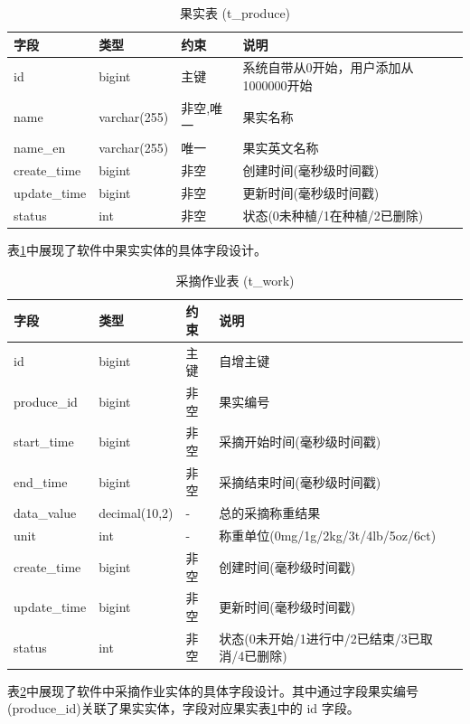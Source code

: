 \begin{table}[H]
\centering
\caption{果实表 (t\_produce)}
\label{tab:produce}
\begin{tabular}{|l|l|l|l|}
\hline
字段 & 类型 & 约束 & 说明 \\
\hline
id & bigint & 主键 & 系统自带从0开始，用户添加从1000000开始 \\
name & varchar(255) & 非空,唯一 & 果实名称 \\
name\_en & varchar(255) & 唯一 & 果实英文名称 \\
create\_time & bigint & 非空 & 创建时间(毫秒级时间戳) \\
update\_time & bigint & 非空 & 更新时间(毫秒级时间戳) \\
status & int & 非空 & 状态(0未种植/1在种植/2已删除) \\
\hline
\end{tabular}
\end{table}

表\ref{tab:produce}中展现了软件中果实实体的具体字段设计。

\begin{table}[H]
\centering
\caption{采摘作业表 (t\_work)}
\label{tab:work}
\begin{tabular}{|l|l|l|l|}
\hline
字段 & 类型 & 约束 & 说明 \\
\hline
id & bigint & 主键 & 自增主键 \\
produce\_id & bigint & 非空 & 果实编号 \\
start\_time & bigint & 非空 & 采摘开始时间(毫秒级时间戳) \\
end\_time & bigint & 非空 & 采摘结束时间(毫秒级时间戳) \\
data\_value & decimal(10,2) & - & 总的采摘称重结果 \\
unit & int & - & 称重单位(0mg/1g/2kg/3t/4lb/5oz/6ct) \\
create\_time & bigint & 非空 & 创建时间(毫秒级时间戳) \\
update\_time & bigint & 非空 & 更新时间(毫秒级时间戳) \\
status & int & 非空 & 状态(0未开始/1进行中/2已结束/3已取消/4已删除) \\
\hline
\end{tabular}
\end{table}

表\ref{tab:work}中展现了软件中采摘作业实体的具体字段设计。其中通过字段果实编号(produce\_id)关联了果实实体，字段对应果实表\ref{tab:produce}中的 id 字段。

